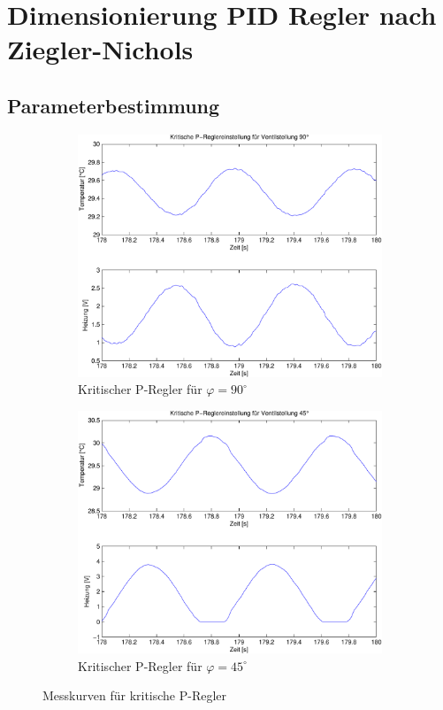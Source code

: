 \section{Dimensionierung PID Regler nach Ziegler-Nichols}

\subsection{Parameterbestimmung}

\begin{figure}[h!]
	\centering
	\begin{subfigure}{0.475\textwidth}
		\includegraphics[width=1\textwidth]{06/p_krit_full_plot.pdf}
		\caption{Kritischer P-Regler für $\varphi = 90^\circ$}
	\end{subfigure}
	\hfill{}
	\begin{subfigure}{0.475\textwidth}
		\includegraphics[width=1\textwidth]{06/p_krit_half_plot.pdf}
		\caption{Kritischer P-Regler für $\varphi = 45^\circ$}
	\end{subfigure}
	\caption{Messkurven für kritische P-Regler}
\end{figure}

